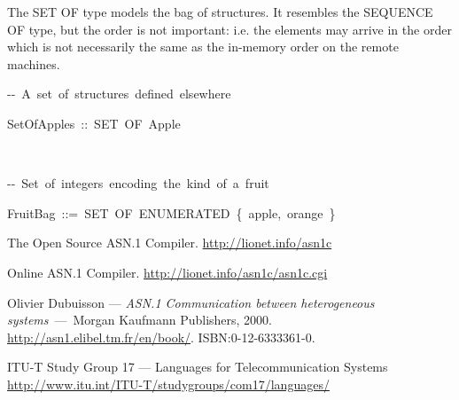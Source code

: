 \documentclass[english,oneside,12pt]{book}
\newenvironment{lyxcode}
{\par\begin{list}{}{
\setlength{\rightmargin}{\leftmargin}
\setlength{\listparindent}{0pt}%
\raggedright
\setlength{\itemsep}{0pt}
\setlength{\parsep}{0pt}
\normalfont\ttfamily}%
 \item[]}
{\end{list}}
\begin{document}
The SET OF type models the bag of structures. It resembles the SEQUENCE
OF type, but the order is not important: i.e. the elements may arrive
in the order which is not necessarily the same as the in-memory order
on the remote machines.
\begin{lyxcode}
-{}-~A~set~of~structures~defined~elsewhere

SetOfApples~::~SET~OF~Apple

~

-{}-~Set~of~integers~encoding~the~kind~of~a~fruit

FruitBag~::=~SET~OF~ENUMERATED~\{~apple,~orange~\}\end{lyxcode}
\begin{thebibliography}{ITU-T/ASN.1}
The Open Source ASN.1 Compiler. \url{http://lionet.info/asn1c}

Online ASN.1 Compiler. \url{http://lionet.info/asn1c/asn1c.cgi}

Olivier Dubuisson --- \emph{ASN.1 Communication
between heterogeneous systems}~---~Morgan Kaufmann Publishers, 2000.
\url{http://asn1.elibel.tm.fr/en/book/}. ISBN:0-12-6333361-0.

ITU-T Study Group 17 --- Languages
for Telecommunication Systems \url{http://www.itu.int/ITU-T/studygroups/com17/languages/}
\end{thebibliography}
\end{document}
